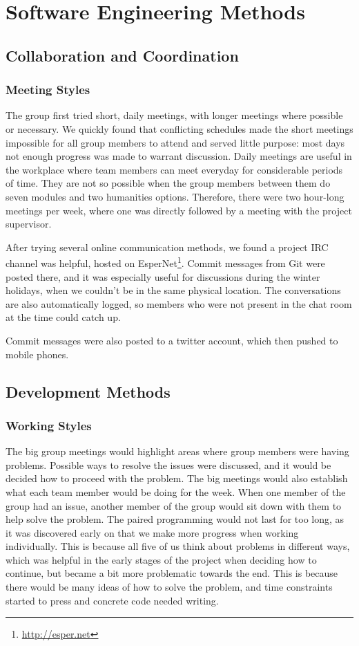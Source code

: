 \chapter{Software Engineering Methods}

\section{Collaboration and Coordination}

  \subsection{Meeting Styles}
    The group first tried short, daily meetings, with longer meetings where possible or necessary.
    We quickly found that conflicting schedules made the short meetings impossible for all group members to attend and served little purpose: most days not enough progress was made to warrant discussion.
    Daily meetings are useful in the workplace where team members can meet everyday for considerable periods of time. They are not so possible when the group members between them do seven modules and two humanities options. Therefore, there were two hour-long meetings per week, where one was directly followed by a meeting with the project supervisor.

    After trying several online communication methods, we found a project IRC channel was helpful, hosted on EsperNet\footnote{\url{http://esper.net}}.
    Commit messages from Git were posted there, and it was especially useful for discussions during the winter holidays, when we couldn't be in the same physical location. The conversations are also automatically logged, so members who were not present in the chat room at the time could catch up.

    Commit messages were also posted to a twitter account, which then pushed to mobile phones.

\section{Development Methods}

  \subsection{Working Styles}
  The big group meetings would highlight areas where group members were having problems. Possible ways to resolve the issues were discussed, and it would be decided how to proceed with the problem. The big meetings would also establish what each team member would be doing for the week. When one member of the group had an issue, another member of the group would sit down with them to help solve the problem. The paired programming would not last for too long, as it was discovered early on that we make more progress when working individually. This is because all five of us think about problems in different ways, which was helpful in the early stages of the project when deciding how to continue, but became a bit more problematic towards the end. This is because there would be many ideas of how to solve the problem, and time constraints started to press and concrete code needed writing.
  
